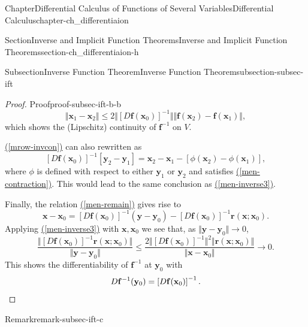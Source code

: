 \documentclass[oneside,10pt,]{book}
\newcommand{\xreffont}{\relax}
\numberwithin{equation}{section}
\newcommand{\qedhere}{\relax}
\begin{document}
\begin{chapterptx}{Chapter}{Differential Calculus of Functions of Several Variables}{}{Differential Calculus}{}{}{chapter-ch_differentiaion}
\begin{sectionptx}{Section}{Inverse and Implicit Function Theorems}{}{Inverse and Implicit Function Theorems}{}{}{section-ch_differentiaion-h}
\begin{subsectionptx}{Subsection}{Inverse Function Theorem}{}{Inverse Function Theorem}{}{}{subsection-subsec-ift}
\begin{proof}{Proof}{}{proof-subsec-ift-b-b}
\begin{equation}
\Vert {\mathbf x}_{1}-{\mathbf x}_{2}\Vert \le 2 
\Vert \left[D{\mathbf f}({\mathbf x}_{0})\right]^{-1}\Vert
\Vert {\mathbf f}({\mathbf x}_2)- {\mathbf f}({\mathbf x}_1) \Vert,\label{men-inverse3}
\end{equation}
which shows the (Lipschitz) continuity of \({\mathbf f}^{-1}\) on \(V\).%
\par
\hyperref[mrow-invcon]{({\xreffont\ref{mrow-invcon}})} can also rewritten as%
\begin{equation*}
\left[D{\mathbf f}({\mathbf x}_{0})\right]^{-1}\left[{\mathbf y}_{2}- {\mathbf y}_{1}\right]=
{\mathbf x}_2 - {\mathbf x}_1- \left[\phi({\mathbf x}_2)-\phi({\mathbf x}_1)\right],
\end{equation*}
where \(\phi\) is defined with respect to either \({\mathbf y}_{1}\) or \({\mathbf y}_{2}\) and satisfies  \hyperref[men-contraction]{({\xreffont\ref{men-contraction}})}.  This would lead to the same conclusion as \hyperref[men-inverse3]{({\xreffont\ref{men-inverse3}})}.%
\par
Finally,  the relation \hyperref[men-remain]{({\xreffont\ref{men-remain}})}  gives rise to%
\begin{equation*}
{\mathbf x}- {\mathbf x}_{0}=\left[D{\mathbf f}({\mathbf x}_{0})\right]^{-1} ({\mathbf y}- {\mathbf y}_{0}) -
\left[D{\mathbf f}({\mathbf x}_{0})\right]^{-1} {\mathbf r}({\mathbf x}; {\mathbf x}_{0}).
\end{equation*}
Applying \hyperref[men-inverse3]{({\xreffont\ref{men-inverse3}})} with \({\mathbf x}, {\mathbf x}_{0}\) we see that, as \(\Vert {\mathbf y}- {\mathbf y}_{0}\Vert \to 0\),%
\begin{equation*}
\frac{\Vert \left[D{\mathbf f}({\mathbf x}_{0})\right]^{-1} {\mathbf r}({\mathbf x}; {\mathbf x}_{0}) \Vert}
{\Vert {\mathbf y}- {\mathbf y}_{0}\Vert }
\le \frac{2\Vert \left[D{\mathbf f}({\mathbf x}_{0})\right]^{-1}\Vert^{2} 
\Vert {\mathbf r}({\mathbf x}; {\mathbf x}_{0}) \Vert}{
\Vert  {\mathbf x}- {\mathbf x}_{0} \Vert } \to 0\text{.}
\end{equation*}
This shows the differentiability of \({\mathbf f}^{-1}\) at \({\mathbf y}_{0}\) with%
\begin{equation*}
D{\mathbf f}^{-1} ({\mathbf y_{0}}) = \left[D{\mathbf f}({\mathbf x}_{0})\right]^{-1}.\qedhere
\end{equation*}
%
\end{proof}
\begin{remark}{Remark}{}{remark-subsec-ift-c}%

\end{remark}
\end{subsectionptx}
\end{sectionptx}
\end{chapterptx}
\end{document}
